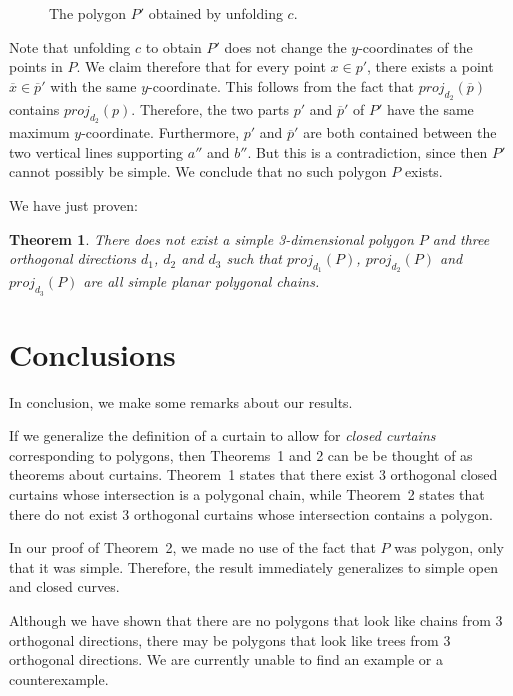 \documentclass[12pt]{article}
\newcommand{\centeripe}[1]{\begin{center}\Ipe{#1}\end{center}}
\newcommand{\figlabel}[1]{\label{fig:#1}}
\newtheorem{thm}{Theorem}{\bfseries}{\itshape}
\newcommand{\proj}{\mathit{proj}}
\newcommand{\pbar}{\overline{p}}
\newcommand{\xbar}{\overline{x}}
\begin{document}
\begin{figure}
\centeripe{unfolded.ipe}
\caption{The polygon $P'$ obtained by unfolding $c$.}
\figlabel{pprime}
\end{figure}

Note that unfolding $c$ to obtain $P'$ does not change the
$y$-coordinates of the points in $P$.  We claim therefore that for
every point $x\in p'$, there exists a point $\xbar\in\pbar'$ with the
same $y$-coordinate.  This follows from the fact that
$\proj_{d_2}(\pbar)$ contains $\proj_{d_2}(p)$.  Therefore, the two
parts $p'$ and $\pbar'$ of $P'$ have the same maximum $y$-coordinate.
Furthermore, $p'$ and $\pbar'$ are both contained between the two
vertical lines supporting $a''$ and $b''$.  But this is a
contradiction, since then $P'$ cannot possibly be simple.  We conclude
that no such polygon $P$ exists.

We have just proven:

\begin{thm}
There does not exist a simple 3-dimensional polygon $P$ and three
orthogonal directions $d_1$, $d_2$ and $d_3$ such that
$\proj_{d_1}(P)$, $\proj_{d_2}(P)$ and $\proj_{d_3}(P)$ are all simple
planar polygonal chains.
\end{thm}


\section{Conclusions}

In conclusion, we make some remarks about our results.

If we generalize the definition of a curtain to allow for {\em closed
curtains} corresponding to polygons, then Theorems~1 and 2 can be be
thought of as theorems about curtains.  Theorem~1 states that there
exist 3 orthogonal closed curtains whose intersection is a polygonal
chain, while Theorem~2 states that there do not exist 3 orthogonal
curtains whose intersection contains a polygon.

In our proof of Theorem~2, we made no use of the fact that $P$ was
polygon, only that it was simple.  Therefore, the result immediately
generalizes to simple open and closed curves.

Although we have shown that there are no polygons that look like
chains from 3 orthogonal directions, there may be polygons that look
like trees from 3 orthogonal directions.  We are currently unable to
find an example or a counterexample.
\end{document}
